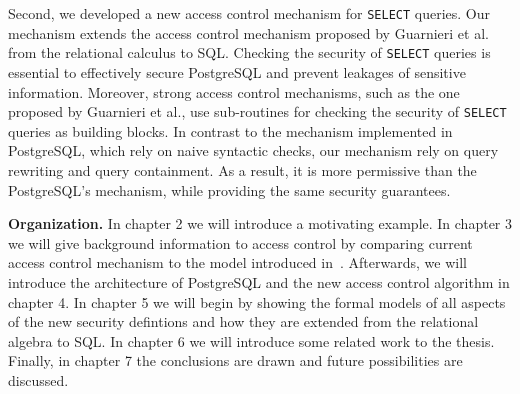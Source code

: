 Second, we developed a new access control mechanism for \texttt{SELECT} queries.
%
Our mechanism extends the access control mechanism proposed by Guarnieri et al.~\cite{guarnieri2016strong} from the relational calculus to SQL.
%
%
%
%
Checking the security of \texttt{SELECT} queries is essential to effectively secure  PostgreSQL and prevent leakages of sensitive information. 
%
Moreover, strong access control mechanisms, such as the one proposed by Guarnieri et al., use sub-routines for checking the security of \texttt{SELECT} queries as building blocks. 
%
In contrast to the mechanism implemented in PostgreSQL, which rely on naive syntactic checks, our mechanism rely on query rewriting and query containment.
%
As a result, it is more permissive than the PostgreSQL's mechanism, while providing the same security guarantees. 
%

\smallskip
\noindent
{\bf Organization.}
%
%
In chapter 2 we will introduce a motivating example.
%
In chapter 3 we will give background information to access control by comparing current access control mechanism to the model introduced in~\cite{guarnieri2016strong}.
%
Afterwards, we will introduce the architecture of PostgreSQL and the new access control algorithm in chapter 4. 
%
In chapter 5 we will begin by showing the formal models of all aspects of the new security defintions and how they are extended from the relational algebra to SQL.  
%
In chapter 6 we will introduce some related work to the thesis. 
%
Finally, in chapter 7 the conclusions are drawn and future possibilities are discussed.
